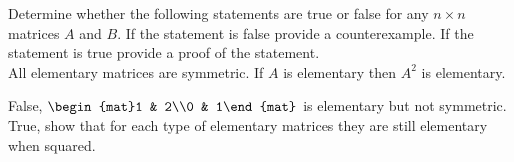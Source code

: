 
\begin{Exercise}[
name={},
title={}, 
difficulty=0,
origin={\cite{BS}}]
\end{Exercise}
Determine whether the following statements are true or false for any $n\times n$
matrices $A$ and $B$.  If the statement is false provide a counterexample. If the
statement is true provide a proof of the statement.\\
\Question All elementary matrices are symmetric.
\Question If $A$ is elementary then $A^2$ is elementary.
\begin{Answer}
\Question False, $\begin{mat}1 & 2\\0 & 1\end{mat}$ is elementary but not symmetric.
\Question True, show that for each type of elementary matrices they are still elementary when squared.
\end{Answer}
